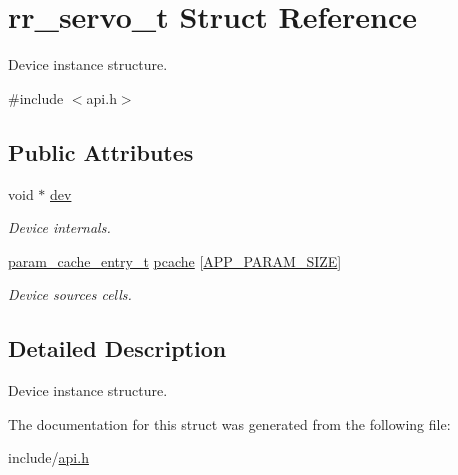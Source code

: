 \hypertarget{structrr__servo__t}{}\section{rr\+\_\+servo\+\_\+t Struct Reference}
\label{structrr__servo__t}


Device instance structure.  




{\ttfamily \#include $<$api.\+h$>$}

\subsection*{Public Attributes}
\begin{DoxyCompactItemize}
\item 
\mbox{\label{structrr__servo__t_a67e68e5e0ea7410959b47a8ddd4765a3}} 
void $\ast$ \hyperlink{structrr__servo__t_a67e68e5e0ea7410959b47a8ddd4765a3}{dev}
\begin{DoxyCompactList}\small\item\em Device internals. \end{DoxyCompactList}\item 
\mbox{\label{structrr__servo__t_ae63cbb3a7a4ba02f5691949556de09d4}} 
\hyperlink{structparam__cache__entry__t}{param\+\_\+cache\+\_\+entry\+\_\+t} \hyperlink{structrr__servo__t_ae63cbb3a7a4ba02f5691949556de09d4}{pcache} \mbox{[}\hyperlink{api_8h_aa1f58887fab4642cf49f6f453c1d276daf913094f39a1622c91c85b522ccd4b0e}{A\+P\+P\+\_\+\+P\+A\+R\+A\+M\+\_\+\+S\+I\+ZE}\mbox{]}
\begin{DoxyCompactList}\small\item\em Device sources cells. \end{DoxyCompactList}\end{DoxyCompactItemize}


\subsection{Detailed Description}
Device instance structure. 

The documentation for this struct was generated from the following file\+:\begin{DoxyCompactItemize}
\item 
include/\hyperlink{api_8h}{api.\+h}\end{DoxyCompactItemize}
